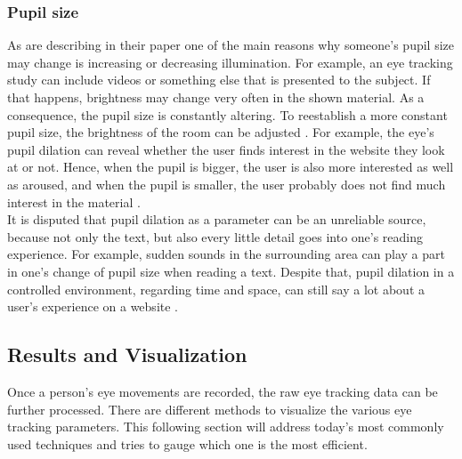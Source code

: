\subsubsection{Pupil size}
As \textcite{goldberg2003eye} are describing in their paper one of the main reasons why someone's pupil size may change is increasing or decreasing illumination. For example, an eye tracking study can include videos or something else that is presented to the subject. If that happens, brightness may change very often in the shown material. As a consequence, the pupil size is constantly altering. To reestablish a more constant pupil size, the brightness of the room can be adjusted \autocite[]{goldberg2003eye}.
For example, the eye's pupil dilation can reveal whether the user finds interest in the website they look at or not. Hence, when the pupil is bigger, the user is also more interested as well as aroused, and when the pupil is smaller, the user probably does not find much interest in the material \autocite[]{joachims2017accurately}.\\
It is disputed that pupil dilation as a parameter can be an unreliable source, because not only the text, but also every little detail goes into one's reading experience. For example, sudden sounds in the surrounding area can play a part in one's change of pupil size when reading a text. 
Despite that, pupil dilation in a controlled environment, regarding time and space, can still say a lot about a user's experience on a website \autocite[]{bruneau2002eyes}.

\subsection{Results and Visualization}
\label{subsection:ResultsVisualization}
Once a person's eye movements are recorded, the raw eye tracking data can be further processed. There are different methods to visualize the various eye tracking parameters. This following section will address today's most commonly used techniques and tries to gauge which one is the most efficient.

